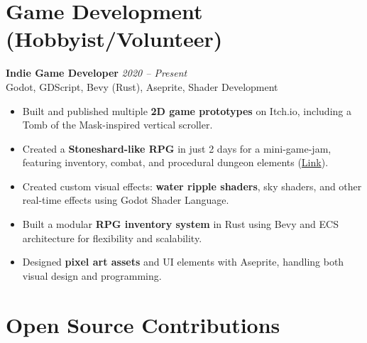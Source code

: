 \documentclass[11pt,letterpaper]{article}
\newcommand{\subsecitem}[4]{
  {\textbf{#1}} \hfill {\small\textit{#2}}\\
  {\small\color{accent}#3} \hfill {\small\textit{#4}}\\
  \vspace{-2pt}
}
\newcommand{\bigbullet}[1]{
  \begin{itemize}[leftmargin=1.2em, itemsep=-1pt, topsep=-2pt, parsep=0pt, partopsep=0pt]
    \item \small{#1}
  \end{itemize}
}
\begin{document}
\section{Game Development (Hobbyist/Volunteer)}

\subsecitem{Indie Game Developer}{2020 -- Present}
          {Godot, GDScript, Bevy (Rust), Aseprite, Shader Development}
          {}
\bigbullet{Built and published multiple \textbf{2D game prototypes} on Itch.io, including a Tomb of the Mask-inspired vertical scroller.}
\bigbullet{Created a \textbf{Stoneshard-like RPG} in just 2 days for a mini-game-jam, featuring inventory, combat, and procedural dungeon elements (\href{https://x1vi.itch.io/rpg-game-testing-can-break}{Link}).}
\bigbullet{Created custom visual effects: \textbf{water ripple shaders}, sky shaders, and other real-time effects using Godot Shader Language.}
\bigbullet{Built a modular \textbf{RPG inventory system} in Rust using Bevy and ECS architecture for flexibility and scalability.}
\bigbullet{Designed \textbf{pixel art assets} and UI elements with Aseprite, handling both visual design and programming.}

\section{Open Source Contributions}
\end{document}
